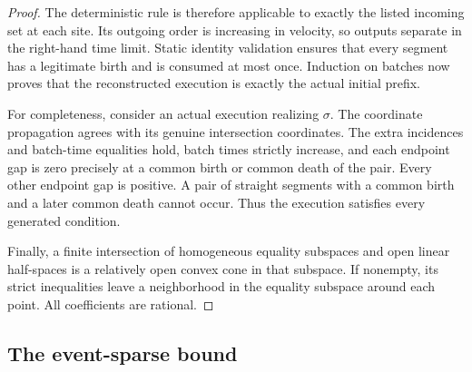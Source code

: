 \documentclass[11pt,letterpaper]{article}
\numberwithin{equation}{section}
\theoremstyle{definition}
\theoremstyle{remark}
\begin{document}
\begin{proof}
The deterministic rule is therefore applicable to exactly the listed
incoming set at each site. Its outgoing order is increasing in velocity,
so outputs separate in the right-hand time limit. Static identity validation
ensures that every segment has a legitimate birth and is consumed at most
once. Induction on batches now proves that the reconstructed execution is
exactly the actual initial prefix.

For completeness, consider an actual execution realizing $\sigma$. The
coordinate propagation agrees with its genuine intersection coordinates.
The extra incidences and batch-time equalities hold, batch times strictly
increase, and each endpoint gap is zero precisely at a common birth or
common death of the pair. Every other endpoint gap is positive. A pair of
straight segments with a common birth and a later common death cannot occur.
Thus the execution satisfies every generated condition.

Finally, a finite intersection of homogeneous equality subspaces and open
linear half-spaces is a relatively open convex cone in that subspace. If
nonempty, its strict inequalities leave a neighborhood in the equality
subspace around each point. All coefficients are rational.
\end{proof}

\subsection{The event-sparse bound}
\end{document}
